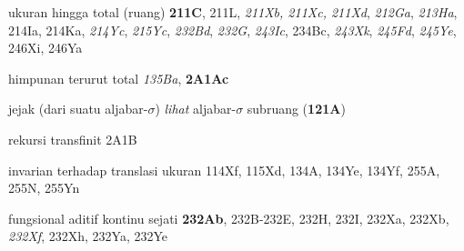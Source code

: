 



ukuran hingga total (ruang) {\bf 211C}, 211L, {\it 211Xb, 211Xc, 211Xd},
{\it 212Ga}, {\it 213Ha}, 214Ia, 214Ka, {\it 214Yc}, {\it 215Yc},
{\it 232Bd}, {\it 232G}, {\it 243Ic}, 234Bc, {\it 243Xk}, {\it 245Fd},
{\it 245Ye}, 246Xi, 246Ya







himpunan terurut total {\it 135Ba}, {\bf
  2A1Ac}
  










{jejak }
(dari suatu aljabar-$\sigma$) {\it lihat} aljabar-$\sigma$ subruang ({\bf 121A})



rekursi transfinit 2A1B

















{invarian terhadap translasi }
ukuran 114Xf, 115Xd, 134A, 134Ye, 134Yf,
  255A, 255N, 255Yn
  















fungsional aditif kontinu sejati {\bf 232Ab},
232B-232E, 
232H, 232I, 232Xa, 232Xb, {\it 232Xf}, 232Xh, 232Ya, 232Ye


























